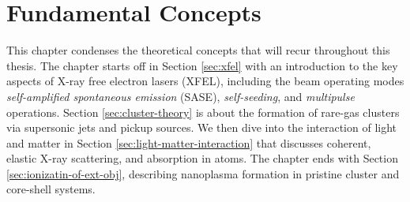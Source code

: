 \chapter{Fundamental Concepts}\label{ch:fundamental_concepts}
This chapter condenses the theoretical concepts that will recur throughout this thesis. The chapter starts off in Section \ref{sec:xfel} with an introduction to the key aspects of X-ray free electron lasers (XFEL), including the beam operating modes \textit{self-amplified spontaneous emission} (SASE), \textit{self-seeding}, and \textit{multipulse} operations. Section \ref{sec:cluster-theory} is about the formation of rare-gas clusters via supersonic jets and pickup sources. We then dive into the interaction of light and matter in Section \ref{sec:light-matter-interaction} that discusses coherent, elastic X-ray scattering, and absorption in atoms. The chapter ends with Section \ref{sec:ionizatin-of-ext-obj}, describing nanoplasma formation in pristine cluster and core-shell systems.
%
%
%
